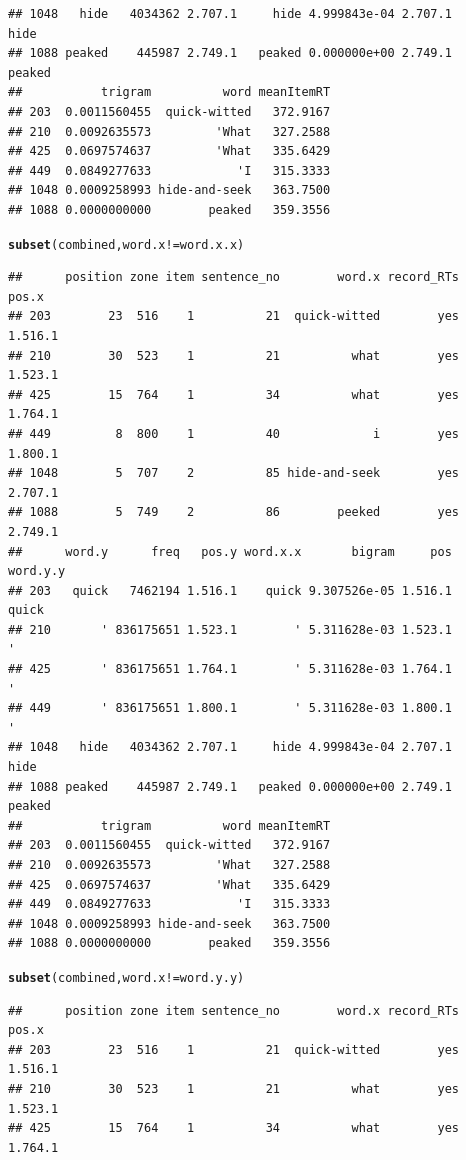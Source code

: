 \documentclass{article}\usepackage[]{graphicx}\usepackage[]{color}
\makeatletter
\newcommand{\hlopt}[1]{\textcolor[rgb]{0,0,0}{#1}}%
\newcommand{\hlstd}[1]{\textcolor[rgb]{0.345,0.345,0.345}{#1}}%
\newcommand{\hlkwd}[1]{\textcolor[rgb]{0.737,0.353,0.396}{\textbf{#1}}}%
\newenvironment{kframe}{%
 \def\at@end@of@kframe{}%
 \ifinner\ifhmode%
  \def\at@end@of@kframe{\end{minipage}}%
  \begin{minipage}{\columnwidth}%
 \fi\fi%
 \def\FrameCommand##1{\hskip\@totalleftmargin \hskip-\fboxsep
 \colorbox{shadecolor}{##1}\hskip-\fboxsep
     \hskip-\linewidth \hskip-\@totalleftmargin \hskip\columnwidth}%
 \MakeFramed {\advance\hsize-\width
   \@totalleftmargin\z@ \linewidth\hsize
   \@setminipage}}%
 {\par\unskip\endMakeFramed%
 \at@end@of@kframe}
\newenvironment{knitrout}{}{} %
\makeatother
\begin{document}
\begin{knitrout}
\begin{kframe}
\begin{verbatim}
## 1048   hide   4034362 2.707.1     hide 4.999843e-04 2.707.1     hide
## 1088 peaked    445987 2.749.1   peaked 0.000000e+00 2.749.1   peaked
##           trigram          word meanItemRT
## 203  0.0011560455  quick-witted   372.9167
## 210  0.0092635573         'What   327.2588
## 425  0.0697574637         'What   335.6429
## 449  0.0849277633            'I   315.3333
## 1048 0.0009258993 hide-and-seek   363.7500
## 1088 0.0000000000        peaked   359.3556
\end{verbatim}
\begin{alltt}
\hlkwd{subset}\hlstd{(combined, word.x} \hlopt{!=} \hlstd{word.x.x)}
\end{alltt}
\begin{verbatim}
##      position zone item sentence_no        word.x record_RTs   pos.x
## 203        23  516    1          21  quick-witted        yes 1.516.1
## 210        30  523    1          21          what        yes 1.523.1
## 425        15  764    1          34          what        yes 1.764.1
## 449         8  800    1          40             i        yes 1.800.1
## 1048        5  707    2          85 hide-and-seek        yes 2.707.1
## 1088        5  749    2          86        peeked        yes 2.749.1
##      word.y      freq   pos.y word.x.x       bigram     pos word.y.y
## 203   quick   7462194 1.516.1    quick 9.307526e-05 1.516.1    quick
## 210       ' 836175651 1.523.1        ' 5.311628e-03 1.523.1        '
## 425       ' 836175651 1.764.1        ' 5.311628e-03 1.764.1        '
## 449       ' 836175651 1.800.1        ' 5.311628e-03 1.800.1        '
## 1048   hide   4034362 2.707.1     hide 4.999843e-04 2.707.1     hide
## 1088 peaked    445987 2.749.1   peaked 0.000000e+00 2.749.1   peaked
##           trigram          word meanItemRT
## 203  0.0011560455  quick-witted   372.9167
## 210  0.0092635573         'What   327.2588
## 425  0.0697574637         'What   335.6429
## 449  0.0849277633            'I   315.3333
## 1048 0.0009258993 hide-and-seek   363.7500
## 1088 0.0000000000        peaked   359.3556
\end{verbatim}
\begin{alltt}
\hlkwd{subset}\hlstd{(combined, word.x} \hlopt{!=} \hlstd{word.y.y)}
\end{alltt}
\begin{verbatim}
##      position zone item sentence_no        word.x record_RTs   pos.x
## 203        23  516    1          21  quick-witted        yes 1.516.1
## 210        30  523    1          21          what        yes 1.523.1
## 425        15  764    1          34          what        yes 1.764.1

\end{verbatim}
\end{kframe}
\end{knitrout}
\end{document}
